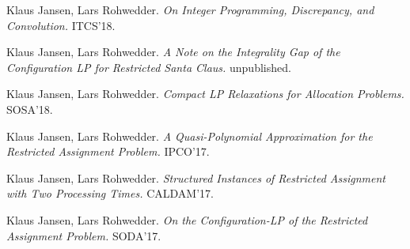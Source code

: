 \documentclass{article}
\begin{document}
  
     \noindent
     Klaus Jansen, Lars Rohwedder. {\it On Integer Programming, Discrepancy, and Convolution.} ITCS'18. \medskip

  
     \noindent
     Klaus Jansen, Lars Rohwedder. {\it A Note on the Integrality Gap of the Configuration LP for Restricted Santa Claus.} unpublished. \medskip

  
     \noindent
     Klaus Jansen, Lars Rohwedder. {\it Compact LP Relaxations for Allocation Problems.} SOSA'18. \medskip

  
     \noindent
     Klaus Jansen, Lars Rohwedder. {\it A Quasi-Polynomial Approximation for the Restricted Assignment Problem.} IPCO'17. \medskip

  
     \noindent
     Klaus Jansen, Lars Rohwedder. {\it Structured Instances of Restricted Assignment with Two Processing Times.} CALDAM'17. \medskip

  
     \noindent
     Klaus Jansen, Lars Rohwedder. {\it On the Configuration-LP of the Restricted Assignment Problem.} SODA'17. \medskip

  
\end{document}
